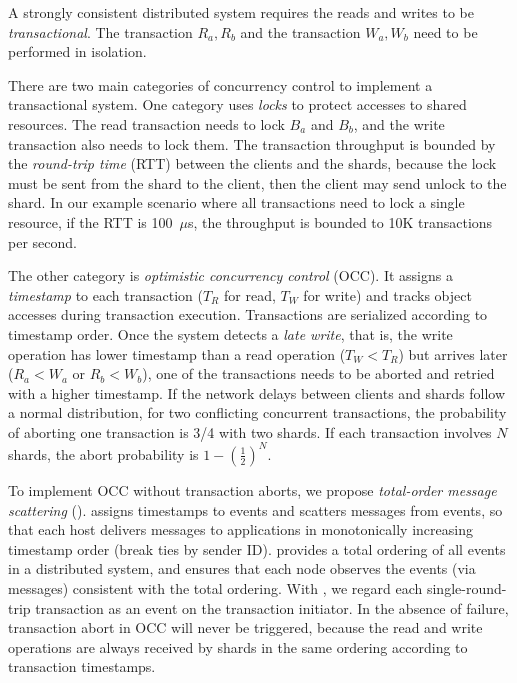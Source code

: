 A strongly consistent distributed system requires the reads and writes to be \textit{transactional}. The transaction $R_a, R_b$ and the transaction $W_a, W_b$ need to be performed in isolation.

There are two main categories of concurrency control to implement a transactional system. One category uses \textit{locks} to protect accesses to shared resources. The read transaction needs to lock $B_a$ and $B_b$, and the write transaction also needs to lock them. The transaction throughput is bounded by the \textit{round-trip time} (RTT) between the clients and the shards, because the lock must be sent from the shard to the client, then the client may send unlock to the shard.
In our example scenario where all transactions need to lock a single resource, if the RTT is 100~$\mu$s, the throughput is bounded to 10K transactions per second.

The other category is \textit{optimistic concurrency control} (OCC). It assigns a \textit{timestamp} to each transaction ($T_R$ for read, $T_W$ for write) and tracks object accesses during transaction execution. Transactions are serialized according to timestamp order. Once the system detects a \textit{late write}, that is, the write operation has lower timestamp than a read operation ($T_W < T_R$) but arrives later ($R_a < W_a$ or $R_b < W_b$), one of the transactions needs to be aborted and retried with a higher timestamp.
If the network delays between clients and shards follow a normal distribution, for two conflicting concurrent transactions, the probability of aborting one transaction is 3/4 with two shards. If each transaction involves $N$ shards, the abort probability is $1-(\frac{1}{2})^N$.


To implement OCC without transaction aborts, we propose \textit{total-order message scattering} (\sys). \sys assigns timestamps to events and scatters messages from events, so that each host delivers messages to applications in monotonically increasing timestamp order (break ties by sender ID).
\sys provides a total ordering of all events in a distributed system, and ensures that each node observes the events (via messages) consistent with the total ordering.
With \sys, we regard each single-round-trip transaction as an event on the transaction initiator. In the absence of failure, transaction abort in OCC will never be triggered, because the read and write operations are always received by shards in the same ordering according to transaction timestamps.

